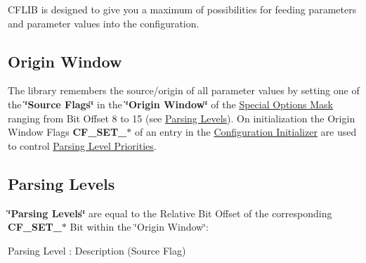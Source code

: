 C\-F\-L\-I\-B is designed to give you a maximum of possibilities for feeding parameters and parameter values into the configuration.\hypertarget{config_levels_origin_window}{}\subsection{Origin Window}\label{config_levels_origin_window}
The library remembers the source/origin of all parameter values by setting one of the {\bfseries \char`\"{}\-Source Flags\char`\"{}} in the {\bfseries \char`\"{}\-Origin Window\char`\"{}} of the \hyperlink{group__special__options__mask}{Special Options Mask} ranging from Bit Offset 8 to 15 (see \hyperlink{config_levels_parsing_levels}{Parsing Levels}). On initialization the Origin Window Flags {\bfseries C\-F\-\_\-\-S\-E\-T\-\_\-$\ast$} of an entry in the \hyperlink{config_initializer}{Configuration Initializer} are used to control \hyperlink{config_levels_parsing_level_priorities}{Parsing Level Priorities}.\hypertarget{config_levels_parsing_levels}{}\subsection{Parsing Levels}\label{config_levels_parsing_levels}
{\bfseries \char`\"{}\-Parsing Levels\char`\"{}} are equal to the Relative Bit Offset of the corresponding {\bfseries C\-F\-\_\-\-S\-E\-T\-\_\-$\ast$} Bit within the \char`\"{}\-Origin Window\char`\"{}\-:

Parsing Level \-: Description (Source Flag)


